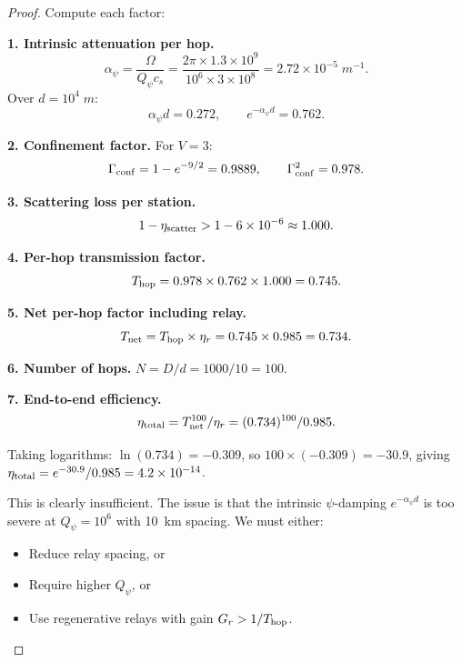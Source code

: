 \documentclass[twocolumn,superscriptaddress,prd]{revtex4-2}
\begin{document}
\begin{proof}
Compute each factor:

\textbf{1. Intrinsic attenuation per hop.}
\begin{equation}
\alpha_\psi = \frac{\Omega}{Q_\psi c_s} = \frac{2\pi \times 1.3 \times 10^9}{10^6 \times 3 \times 10^8} = 2.72 \times 10^{-5}\;\si{m^{-1}}.
\end{equation}
Over $d = 10^4\;\si{m}$:
\begin{equation}
\alpha_\psi d = 0.272, \qquad e^{-\alpha_\psi d} = 0.762.
\end{equation}

\textbf{2. Confinement factor.}
For $V = 3$:
\begin{equation}
\Gamma_{\rm conf} = 1 - e^{-9/2} = 0.9889, \qquad \Gamma_{\rm conf}^2 = 0.978.
\end{equation}

\textbf{3. Scattering loss per station.}
\begin{equation}
1 - \eta_{\rm scatter} > 1 - 6\times 10^{-6} \approx 1.000.
\end{equation}

\textbf{4. Per-hop transmission factor.}
\begin{equation}
T_{\rm hop} = 0.978 \times 0.762 \times 1.000 = 0.745.
\end{equation}

\textbf{5. Net per-hop factor including relay.}
\begin{equation}
T_{\rm net} = T_{\rm hop} \times \eta_r = 0.745 \times 0.985 = 0.734.
\end{equation}

\textbf{6. Number of hops.}
$N = D/d = 1000/10 = 100$.

\textbf{7. End-to-end efficiency.}
\begin{equation}
\eta_{\rm total} = T_{\rm net}^{100}/\eta_r = (0.734)^{100}/0.985.
\end{equation}

Taking logarithms: $\ln(0.734) = -0.309$, so
$100 \times (-0.309) = -30.9$, giving
$\eta_{\rm total} = e^{-30.9}/0.985 = 4.2 \times 10^{-14}$.

This is clearly insufficient.  The issue is that the intrinsic
$\psi$-damping $e^{-\alpha_\psi d}$ is too severe at $Q_\psi = 10^6$
with 10~km spacing.  We must either:
\begin{itemize}
\item[(a)] Reduce relay spacing, or
\item[(b)] Require higher $Q_\psi$, or
\item[(c)] Use regenerative relays with gain $G_r > 1/T_{\rm hop}$.
\end{itemize}


\end{proof}
\end{document}
